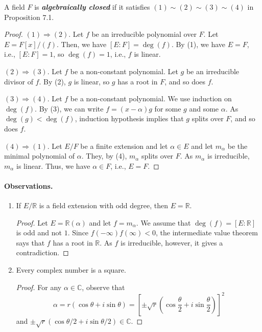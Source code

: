 \documentclass[twoside]{article}
\newcommand\R{\mathbb R}
\newcommand\C{\mathbb C}
\theoremstyle{remark}
\newcounter{theorem}
\newcommand*\term[1]{\textbf{\textit{\mathversion{bold}#1}}}
\begin{document}
\begin{definition}
  A field \(F\) is \term{algebraically closed} if it satisfies \((1) \sim (2) \sim (3) \sim (4)\) in Proposition 7.1.
\end{definition}

\begin{proof}
  \((1) \Rightarrow (2)\). Let \(f\) be an irreducible polynomial over \(F\). Let \(E = F[x]/(f)\). Then, we have \([E:F] = \deg (f)\). By (1), we have \(E=F\), i.e., \([E:F] = 1\), so \(\deg(f) = 1\), i.e., \(f\) is linear.
  
  \smallskip
  
  \((2) \Rightarrow (3)\). Let \(f\) be a non-constant polynomial. Let \(g\) be an irreducible divisor of \(f\). By (2), \(g\) is linear, so \(g\) has a root in \(F\), and so does \(f\).
  
  \smallskip
  
  \((3) \Rightarrow (4)\). Let \(f\) be a non-constant polynomial. We use induction on \(\deg(f)\). By (3), we can write \(f = (x-\alpha)g\) for some \(g\) and some \(\alpha\). As \(\deg(g) < \deg(f)\), induction hypothesis implies that \(g\) splits over \(F\), and so does \(f\).
  
  \smallskip
  
  \((4) \Rightarrow (1)\). Let \(E/F\) be a finite extension and let \(\alpha \in E\) and let \(m_\alpha\) be the minimal polynomial of \(\alpha\). They, by (4), \(m_\alpha\) splits over \(F\). As \(m_\alpha\) is irreducible, \(m_\alpha\) is linear. Thus, we have \(\alpha \in F\), i.e., \(E = F\).
\end{proof}

\paragraph{Observations.}
\begin{enumerate}[label=\textup{\arabic*.}]
  \item If \(E/\R\) is a field extension with odd degree, then \(E = \R\).
  \begin{proof}
    Let \(E = \R(\alpha)\) and let \(f = m_\alpha\). We assume that \(\deg(f) = [E:\R]\) is odd and not \(1\). Since \(f(-\infty) f(\infty) < 0\), the intermediate value theorem says that \(f\) has a root in \(\R\). As \(f\) is irreducible, however, it gives a contradiction.
  \end{proof}
  \item Every complex number is a square.
  \begin{proof}
    For any \(\alpha \in \C\), observe that
    \[ \alpha = r (\cos\theta + i\sin\theta) = \left[ \pm \sqrt r \left( \cos\frac\theta2 + i\sin\frac\theta2 \right) \right]^2 \]
    and \(\pm\sqrt r (\cos\theta/2 + i\sin\theta/2) \in \C\).
  \end{proof}
\end{enumerate}
\end{document}
